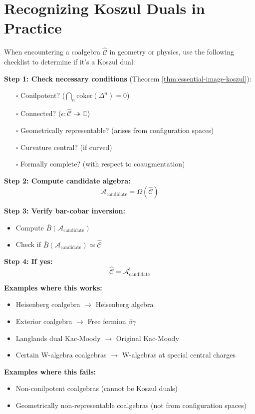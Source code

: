 
\section{Recognizing Koszul Duals in Practice}
\label{sec:recognizing-koszul-duals}

\begin{remark}\label{rem:identify-koszul-wild}
When encountering a coalgebra $\widehat{\mathcal{C}}$ in geometry or physics, use 
the following checklist to determine if it's a Koszul dual:

\textbf{Step 1: Check necessary conditions} (Theorem \ref{thm:essential-image-koszul}):
\begin{itemize}
\item[$\square$] Conilpotent? ($\bigcap_n \text{coker}(\Delta^n) = 0$)
\item[$\square$] Connected? ($\epsilon: \widehat{\mathcal{C}} \twoheadrightarrow \mathbb{C}$)
\item[$\square$] Geometrically representable? (arises from configuration spaces)
\item[$\square$] Curvature central? (if curved)
\item[$\square$] Formally complete? (with respect to coaugmentation)
\end{itemize}

\textbf{Step 2: Compute candidate algebra:}
$$\mathcal{A}_{\text{candidate}} = \Omega(\widehat{\mathcal{C}})$$

\textbf{Step 3: Verify bar-cobar inversion:}
\begin{itemize}
\item Compute $\bar{B}(\mathcal{A}_{\text{candidate}})$
\item Check if $\bar{B}(\mathcal{A}_{\text{candidate}}) \simeq \widehat{\mathcal{C}}$
\end{itemize}

\textbf{Step 4: If yes:}
$$\widehat{\mathcal{C}} = \mathcal{A}_{\text{candidate}}^!$$

\textbf{Examples where this works:}
\begin{itemize}
\item Heisenberg coalgebra $\to$ Heisenberg algebra
\item Exterior coalgebra $\to$ Free fermion $\beta\gamma$
\item Langlands dual Kac-Moody $\to$ Original Kac-Moody
\item Certain W-algebra coalgebras $\to$ W-algebras at special central charges
\end{itemize}

\textbf{Examples where this fails:}
\begin{itemize}
\item Non-conilpotent coalgebras (cannot be Koszul duals)
\item Geometrically non-representable coalgebras (not from configuration spaces)
\end{itemize}
\end{remark}


